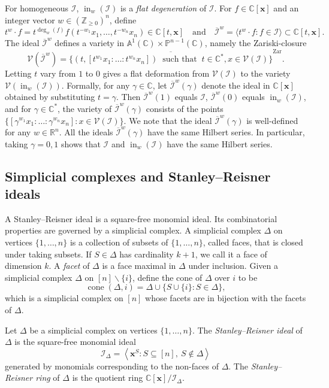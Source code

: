 \documentclass[ALCO,ThmDefs,Unicode,epreuves]{cedram}
\newcommand{\PP}{\mathbb{P}}
\newcommand{\Z}{\mathbb{Z}}
\newcommand{\R}{\mathbb{R}}
\newcommand{\Cbb}{\mathbb{C}}
\newcommand{\V}{\mathcal{V}}
\newcommand{\I}{\mathcal{I}}
\newcommand{\x}{\mathbf{x}}
\newcommand{\ol}{\overline}
\DeclareMathOperator{\In}{in}
\DeclareMathOperator{\Zar}{Zar}
\DeclareMathOperator{\cone}{cone}
\begin{document}
For homogeneous $\I$, $\In_w(\I)$ is a \emph{flat degeneration} of $\I$. 
For $f\in \Cbb[\x]$ and an integer vector $w\in (\Z_{\geq 0})^n$, define 
\[t^w\cdot f = t^{\deg_w(f)}f(t^{-w_1}x_1, \ldots , t^{-w_n}x_n) \in \Cbb[t,\x]
\quad \text{and} \quad
\ol{\I}^w = \langle t^{w}\cdot f : f\in \I \rangle \subset \Cbb[t,\x].
\]
The ideal $\ol{\I}^w$ defines a variety in $\mathbb{A}^1(\Cbb) \times \PP^{n-1}(\Cbb)$,
namely the Zariski-closure 
\[
\V(\ol{\I}^w) = \ol{\bigl\{ (t, [t^{w_1} x_1 : \ldots : t^{w_n}x_n ]) \ \text{ such that } \ t\in {\Cbb^*}, x\in \V(\I)\bigl\}}^{\Zar}.
\]
Letting $t$ vary from $1$ to $0$ gives a flat deformation from $\V(\I)$ to 
the variety $\V(\In_w(\I))$. Formally, for any $\gamma\in \Cbb$, let $\ol{\I}^w(\gamma)$ denote the ideal in $\Cbb[\x]$
obtained by substituting $t = \gamma$. 
Then $\ol{\I}^w(1)$ equals $ \I$, $\ol{\I}^w(0)$ equals $\In_w(\I)$, 
and for $\gamma\in \Cbb^*$, the variety of $\ol{\I}^w(\gamma)$ 
consists of the points $\{[\gamma^{w_1} x_1 : \ldots : \gamma^{w_n}x_n] : x\in \V(\I)\}$. 
We note that the ideal $\ol{\I}^w(\gamma)$ is well-defined for any $w\in \R^n$. 
All the ideals $\ol{\I}^w(\gamma)$ have the same Hilbert series. 
In particular, taking $\gamma = 0,1$ shows that $\I$ and $\In_w(\I)$ have the same Hilbert series. 


\subsection{Simplicial complexes and Stanley--Reisner ideals} \label{subsec:SRI}
A Stanley--Reisner ideal is a square-free monomial ideal. Its combinatorial 
properties are governed by a simplicial complex. 
A simplicial complex $\Delta$ on vertices $\{1,\ldots ,n\}$ is a collection of subsets of 
$\{1,\ldots , n\}$, called faces, that is closed under taking subsets. If $S \in \Delta$ has 
cardinality $k+1$, we call it a face of dimension $k$. A \emph{facet} of $\Delta$ is a face maximal in $\Delta$ under inclusion. 
Given a simplicial complex $\Delta$ on $[n]\backslash \{i\}$, define the cone of $\Delta$ over $i$ to be 
\[ 
\cone (\Delta, i) = \Delta \cup \{ S\cup \{i\} : S \in \Delta\}, \]
which is a simplicial complex on $[n]$ whose facets are in bijection with the facets of $\Delta$. 

\begin{defi}Let $\Delta$ be a simplicial complex on vertices $\{1,\ldots , n\}$. The \emph{Stanley--Reisner ideal} of $\Delta$ is the square-free monomial ideal 
\[
\I_{\Delta} = \left\langle \x^S \colon S\subseteq [n], \ S\not\in \Delta \right\rangle
\]
generated by monomials corresponding to the non-faces of $\Delta$. The \emph{Stanley--Reisner ring} of $\Delta$ is the quotient ring $\Cbb[\x]/\I_{\Delta}$. 
\end{defi}
\end{document}
